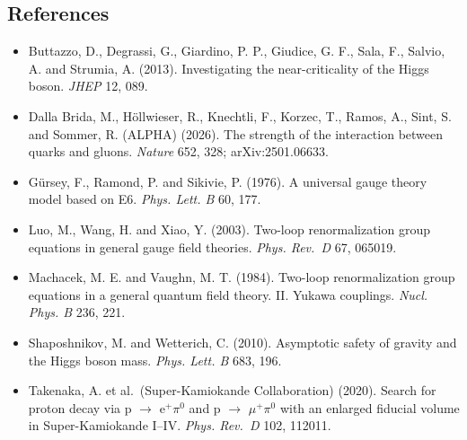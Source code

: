 \documentclass[
  11pt,
]{article}
\providecommand{\tightlist}{%
  \setlength{\itemsep}{0pt}\setlength{\parskip}{0pt}}
\begin{document}
\hypertarget{references}{%
\subsection{References}\label{references}}

\begin{itemize}
\tightlist
\item
  Buttazzo, D., Degrassi, G., Giardino, P. P., Giudice, G. F., Sala, F., Salvio, A. and Strumia, A. (2013). Investigating the near-criticality of the Higgs boson. \emph{JHEP} 12, 089.
\item
  Dalla Brida, M., Höllwieser, R., Knechtli, F., Korzec, T., Ramos, A., Sint, S. and Sommer, R. (ALPHA) (2026). The strength of the interaction between quarks and gluons. \emph{Nature} 652, 328; arXiv:2501.06633.
\item
  Gürsey, F., Ramond, P. and Sikivie, P. (1976). A universal gauge theory model based on E6. \emph{Phys. Lett. B} 60, 177.
\item
  Luo, M., Wang, H. and Xiao, Y. (2003). Two-loop renormalization group equations in general gauge field theories. \emph{Phys. Rev.~D} 67, 065019.
\item
  Machacek, M. E. and Vaughn, M. T. (1984). Two-loop renormalization group equations in a general quantum field theory. II. Yukawa couplings. \emph{Nucl. Phys. B} 236, 221.
\item
  Shaposhnikov, M. and Wetterich, C. (2010). Asymptotic safety of gravity and the Higgs boson mass. \emph{Phys. Lett. B} 683, 196.
\item
  Takenaka, A. et al.~(Super-Kamiokande Collaboration) (2020). Search for proton decay via p \ensuremath{\to} e\ensuremath{^{+}}\ensuremath{\pi}\ensuremath{^{0}} and p \ensuremath{\to} \ensuremath{\mu}\ensuremath{^{+}}\ensuremath{\pi}\ensuremath{^{0}} with an enlarged fiducial volume in Super-Kamiokande I--IV. \emph{Phys. Rev.~D} 102, 112011.
\end{itemize}
\end{document}
